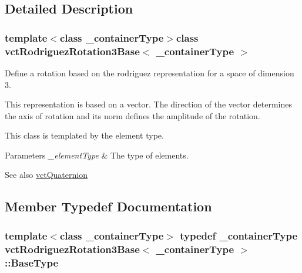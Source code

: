 \subsection{Detailed Description}
\subsubsection*{template$<$class \+\_\+container\+Type$>$class vct\+Rodriguez\+Rotation3\+Base$<$ \+\_\+container\+Type $>$}

Define a rotation based on the rodriguez representation for a space of dimension 3. 

This representation is based on a vector. The direction of the vector determines the axis of rotation and its norm defines the amplitude of the rotation.

This class is templated by the element type.


\begin{DoxyParams}{Parameters}
{\em \+\_\+element\+Type} & The type of elements.\\
\hline
\end{DoxyParams}
\begin{DoxySeeAlso}{See also}
\hyperlink{classvct_quaternion}{vct\+Quaternion} 
\end{DoxySeeAlso}


\subsection{Member Typedef Documentation}
\hypertarget{classvct_rodriguez_rotation3_base_a4269d1ae12fda0dd92eccb3ad5089ce5}{}
\subsubsection[{Base\+Type}]{\setlength{\rightskip}{0pt plus 5cm}template$<$class \+\_\+container\+Type$>$ typedef \+\_\+container\+Type {\bf vct\+Rodriguez\+Rotation3\+Base}$<$ \+\_\+container\+Type $>$\+::{\bf Base\+Type}}\label{classvct_rodriguez_rotation3_base_a4269d1ae12fda0dd92eccb3ad5089ce5}
\hypertarget{classvct_rodriguez_rotation3_base_a121aa7d7f143b0c59ef190ff9bff57d2}{}
